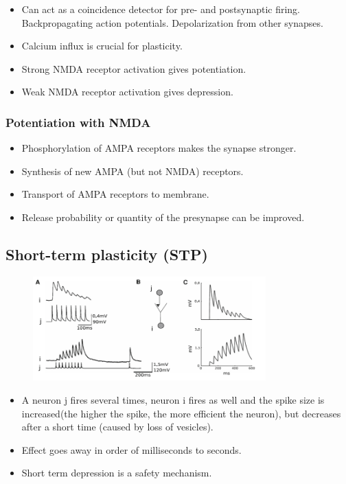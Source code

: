 \documentclass[a4paper, 12pt]{article}
\begin{document}
\begin{itemize}[noitemsep,nolistsep]
	\item Can act as a coincidence detector for pre- and postsynaptic firing.
	\subitem Backpropagating action potentials.
	\subitem Depolarization from other synapses.
	\item Calcium influx is crucial for plasticity.
	\item Strong NMDA receptor activation gives potentiation.
	\item Weak NMDA receptor activation gives depression.
\end{itemize}
\subsubsection{Potentiation with NMDA}
\begin{itemize}[noitemsep,nolistsep]
	\item Phosphorylation of AMPA receptors makes the synapse stronger.
	\item Synthesis of new AMPA (but not NMDA) receptors.
	\item Transport of AMPA receptors to membrane.
	\item Release probability or quantity of the presynapse can be improved.
\end{itemize}

\subsection{Short-term plasticity (STP)}
\begin{figure}[H]
	\includegraphics[width=0.8\textwidth]{STP.png}
\end{figure}
\begin{itemize}[noitemsep,nolistsep]
	\item A neuron j fires several times, neuron i fires as well and the spike size is increased(the higher the spike, the more efficient the neuron), but decreases after a short time (caused by loss of vesicles).
	\item Effect goes away in order of milliseconds to seconds.
	\item Short term depression is a safety mechanism.
\end{itemize}
\end{document}
